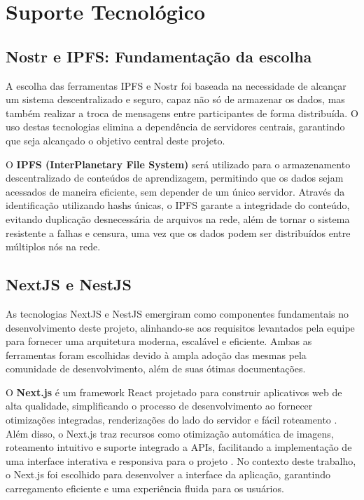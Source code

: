 \chapter[Elementos do Texto]{Suporte Tecnológico}

\section{Nostr e IPFS: Fundamentação da escolha}
A escolha das ferramentas IPFS e Nostr foi baseada na necessidade de alcançar um sistema descentralizado e seguro, capaz não só de armazenar os dados, mas também realizar a troca de mensagens entre participantes de forma distribuída. O uso destas tecnologias elimina a dependência de servidores centrais, garantindo que seja alcançado o objetivo central deste projeto.

O \textbf{IPFS (InterPlanetary File System)} será utilizado para o armazenamento descentralizado de conteúdos de aprendizagem, permitindo que os dados sejam acessados de maneira eficiente, sem depender de um único servidor. Através da identificação utilizando hashs únicas, o IPFS garante a integridade do conteúdo, evitando duplicação desnecessária de arquivos na rede, além de tornar o sistema resistente a falhas e censura, uma vez que os dados podem ser distribuídos entre múltiplos nós na rede.

\section{NextJS e NestJS}
As tecnologias NextJS e NestJS emergiram como componentes fundamentais no desenvolvimento deste projeto, alinhando-se aos requisitos levantados pela equipe para fornecer uma arquitetura moderna, escalável e eficiente. Ambas as ferramentas foram escolhidas devido à ampla adoção das mesmas pela comunidade de desenvolvimento, além de suas ótimas documentações.

O \textbf{Next.js} é um framework React projetado para construir aplicativos web de alta qualidade, simplificando o processo de desenvolvimento ao fornecer otimizações integradas, renderizações do lado do servidor e fácil roteamento \cite{nextjs2025}. Além disso, o Next.js traz recursos como otimização automática de imagens, roteamento intuitivo e suporte integrado a APIs, facilitando a implementação de uma interface interativa e responsiva para o projeto \cite{nextjs2025}. No contexto deste trabalho, o Next.js foi escolhido para desenvolver a interface da aplicação, garantindo carregamento eficiente e uma experiência fluida para os usuários.

